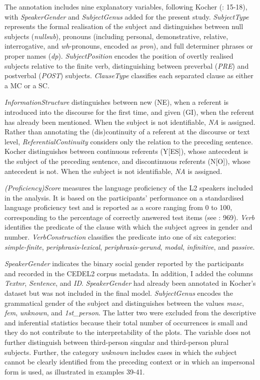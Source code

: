 \documentclass[
  letterpaper,
  DIV=11,
  numbers=noendperiod]{scrartcl}
\begin{document}
The annotation includes nine explanatory variables, following Kocher
(: 15-18), with
\emph{SpeakerGender} and \emph{SubjectGenus} added for the present
study. \emph{SubjectType} represents the formal realisation of the
subject and distinguishes between null subjects (\emph{nullsub}),
pronouns (including personal, demonstrative, relative, interrogative,
and \emph{wh}-pronouns, encoded as \emph{pron}), and full determiner
phrases or proper names (\emph{dp}). \emph{SubjectPosition} encodes the
position of overtly realised subjects relative to the finite verb,
distinguishing between preverbal (\emph{PRE}) and postverbal
(\emph{POST}) subjects. \emph{ClauseType} classifies each separated
clause as either a MC or a SC.

\emph{InformationStructure} distinguishes between new (NE), when a
referent is introduced into the discourse for the first time, and given
(GI), when the referent has already been mentioned. When the subject is
not identifiable, \emph{NA} is assigned. Rather than annotating the
(dis)continuity of a referent at the discourse or text level,
\emph{ReferentialContinuity} considers only the relation to the
preceding sentence. Kocher distinguishes between continuous referents
(Y{[}ES{]}), whose antecedent is the subject of the preceding sentence,
and discontinuous referents (N{[}O{]}), whose antecedent is not. When
the subject is not identifiable, \emph{NA} is assigned.

\emph{(Proficiency)Score} measures the language proficiency of the L2
speakers included in the analysis. It is based on the participants'
performance on a standardised language proficiency test and is reported
as a score ranging from 0 to 100, corresponding to the percentage of
correctly answered test items (see
: 969). \emph{Verb}
identifies the predicate of the clause with which the subject agrees in
gender and number. \emph{VerbConstruction} classifies the predicate into
one of six categories: \emph{simple-finite}, \emph{periphrasis-lexical},
\emph{periphrasis-gerund}, \emph{modal}, \emph{infinitive}, and
\emph{passive}.

\emph{SpeakerGender} indicates the binary social gender reported by the
participants and recorded in the CEDEL2 corpus metadata. In addition, I
added the columns \emph{Textnr}, \emph{Sentence}, and \emph{ID}.
\emph{SpeakerGender} had already been annotated in Kocher's dataset but
was not included in the final model. \emph{SubjectGenus} encodes the
grammatical gender of the subject and distinguishes between the values
\emph{masc}, \emph{fem}, \emph{unknown}, and \emph{1st\_person}. The
latter two were excluded from the descriptive and inferential statistics
because their total number of occurrences is small and they do not
contribute to the interpretability of the plots. The variable does not
further distinguish between third-person singular and third-person
plural subjects. Further, the category \emph{unknown} includes cases in
which the subject cannot be clearly identified from the preceding
context or in which an impersonal form is used, as illustrated in
examples 39-41.
\end{document}
